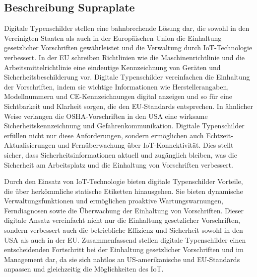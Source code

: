 \subsection{Beschreibung Supraplate}

Digitale Typenschilder stellen eine bahnbrechende Lösung dar, die sowohl in den Vereinigten Staaten als auch in der Europäischen Union die Einhaltung gesetzlicher Vorschriften gewährleistet und die Verwaltung durch IoT-Technologie verbessert.
In der EU schreiben Richtlinien wie die Maschinenrichtlinie und die Arbeitsmittelrichtlinie eine eindeutige Kennzeichnung von Geräten und Sicherheitsbeschilderung vor. Digitale Typenschilder vereinfachen die Einhaltung der Vorschriften, indem sie wichtige Informationen wie Herstellerangaben, Modellnummern und CE-Kennzeichnungen digital anzeigen und so für eine Sichtbarkeit und Klarheit sorgen, die den EU-Standards entsprechen.
In ähnlicher Weise verlangen die OSHA-Vorschriften in den USA eine wirksame Sicherheitskennzeichnung und Gefahrenkommunikation.
Digitale Typenschilder erfüllen nicht nur diese Anforderungen, sondern ermöglichen auch Echtzeit-Aktualisierungen und Fernüberwachung über IoT-Konnektivität. Dies stellt sicher, dass Sicherheitsinformationen aktuell und zugänglich bleiben, was die Sicherheit am Arbeitsplatz und die Einhaltung von Vorschriften verbessert.

Durch den Einsatz von IoT-Technologie bieten digitale Typenschilder Vorteile, die über herkömmliche statische Etiketten hinausgehen. Sie bieten dynamische Verwaltungsfunktionen und ermöglichen proaktive Wartungswarnungen, Ferndiagnosen sowie die Überwachung der Einhaltung von Vorschriften. Dieser digitale Ansatz vereinfacht nicht nur die Einhaltung gesetzlicher Vorschriften, sondern verbessert auch die betriebliche Effizienz und Sicherheit sowohl in den USA als auch in der EU.
Zusammenfassend stellen digitale Typenschilder einen entscheidenden Fortschritt bei der Einhaltung gesetzlicher Vorschriften und im Management dar, da sie sich nahtlos an US-amerikanische und EU-Standards anpassen und gleichzeitig die Möglichkeiten des IoT.
